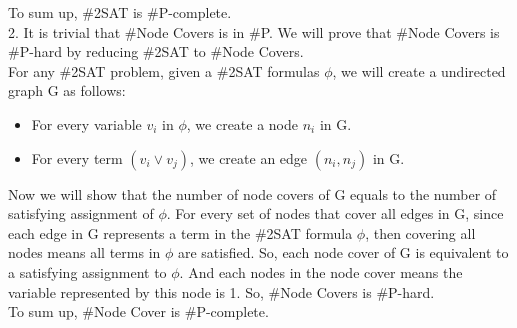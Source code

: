 \documentclass[12pt]{article}
\begin{document}
To sum up, \#2SAT is \#P-complete. \\

2. It is trivial that \#Node Covers is in \#P. We will prove that
\#Node Covers is \#P-hard by reducing \#2SAT to \#Node Covers. \\

For any \#2SAT problem, given a \#2SAT formulas $\phi$, we will create
a undirected graph G as follows:

\begin{itemize}
\item For every variable $v_i$ in $\phi$, we create a node $n_i$ in G.
\item For every term $(v_i \lor v_j)$, we create an edge $(n_i, n_j)$
  in G.
\end{itemize}

Now we will show that the number of node covers of G equals to the
number of satisfying assignment of $\phi$. For every set of nodes that
cover all edges in G, since each edge in G represents a term in the
\#2SAT formula $\phi$, then covering all nodes means all terms in
$\phi$ are satisfied. So, each node cover of G is equivalent to a
satisfying assignment to $\phi$. And each nodes in the node cover
means the variable represented by this node is 1. So, \#Node Covers is
\#P-hard. \\

To sum up, \#Node Cover is \#P-complete.
\end{document}
